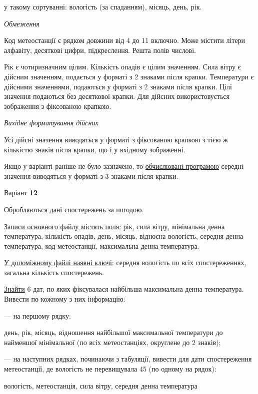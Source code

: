 \documentclass[11pt, ukrainian]{article}
\begin{document}
{\noindent}у такому сортуванні: вологість (за спаданням), місяць, день, рік.


\bigskip\textit{Обмеження}

Код метеостанції є рядком довжини від 4 до 11 включно.
Може містити літери алфавіту, десяткові цифри, підкреслення. Решта полів числові.

Рік є чотиризначним цілим.
Кількість опадів є цілим значенням.
Сила вітру є дійсним значенням, подається у форматі з 2 знаками після крапки.
Температури є дійсними значеннями, подаються у форматі з 2 знаками після крапки.
Цілі значення подаються без десяткової крапки.
Для дійсних використовується зображення з фіксованою крапкою.

\textit{Вихідне форматування дійсних}

Усі дійсні значення виводяться у форматі з фіксованою крапкою з тією ж кількістю знаків після крапки, що і у вхідному зображенні.

Якщо у варіанті раніше не було зазначено, то \underline{обчислювані програмою} середні значення виводяться у форматі з 3 знаками після крапки.


\par
\newpage
{\center Варіант  \No \textbf { 12 }\par}
\bigskip
Обробляються дані спостережень за погодою. 

\underline{Записи основного файлу містять поля}: рік, сила вітру, мінімальна денна температура, кількість опадів, день, місяць, відносна вологість, середня денна температура, код метеостанції, максимальна денна температура.

\underline{У допоміжному файлі наявні ключі}: середня вологість по всіх спостереженнях, загальна кількість спостережень.

\underline{Знайти} 6 дат, по яких фіксувалася найбільша максимальна денна температура. Вивести по кожному з них інформацію:\par
{\noindent}--- на першому рядку:\par
день, рік, місяць, відношення найбільшої максимальної температури до найменшої мінімальної (по всіх метеостанціях, округлене до 2 знаків);

{\noindent}--- на наступних рядках, починаючи з табуляції, вивести для дати спостереження метеостанції, де вологість не перевищувала 45 (по одному на рядок):\par
вологість, метеостанція, сила вітру, середня денна температура
\end{document}
